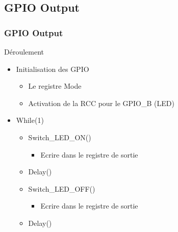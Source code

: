 \documentclass{beamer}
\begin{document}
		\subsection{GPIO Output}
			\begin{frame}
				\frametitle{GPIO Output}
				\begin{block}{ Déroulement }
					\begin{itemize}
						\item Initialisation des GPIO
							\begin{itemize}
								\item Le registre Mode
								\item Activation de la RCC pour le GPIO\_B (LED)
							\end{itemize}
						\item While(1)
							\begin{itemize}
								\item Switch\_LED\_ON()
									\begin{itemize}
										\item Ecrire dans le registre de sortie
									\end{itemize}
								\item Delay()
								\item Switch\_LED\_OFF()
									\begin{itemize}
										\item Ecrire dans le registre de sortie
									\end{itemize}
								\item Delay()
							\end{itemize}
					\end{itemize}
				\end{block}
			\end{frame}
			
			
			
\end{document}
